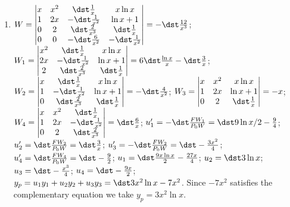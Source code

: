 \documentclass[openany]{book}
\newenvironment{sectionSolutions}{
 \begin{enumerate}[item-label={\thesection.\arabic{enumi}.}]
}{
 \end{enumerate}
}
\begin{document}
\begin{sectionSolutions}
\item
$W=\begin{vmatrix}
x&x^2&\dst\frac{1}{ x}&x\ln x\\1&2x&-\dst\frac{1}{ x^2}&\ln x+1\\
0&2&\dst\frac{2}{ x^3}&\dst\frac{1}{ x}\\0&0&-\dst\frac{6}{ x^2}&-\dst\frac{1}{ x^2}
\end{vmatrix}=-\dst\frac{12}{ x^3}$;
$W_1=\begin{vmatrix}
x^2&\dst\frac{1}{ x}&x\ln x\\2x&-\dst\frac{1}{ x^2}&\ln x+1\\
2&\dst\frac{2}{ x^3}&\dst\frac{1}{ x}\end{vmatrix}=6\dst\frac{\ln
x}{ x}-\dst\frac{3}{ x}$;
$W_2=\begin{vmatrix}
x&\dst\frac{1}{ x}&x\ln x\\1&-\dst\frac{1}{ x^2}&\ln x+1\\
0&\dst\frac{2}{ x^3}&\dst\frac{1}{ x}\end{vmatrix}=-\dst\frac{4}{
x^2}$;
$W_3=\begin{vmatrix}x&x^2&x\ln x\\
1&2x&\ln x+1\\0&2&\dst\frac{1}{ x}\end{vmatrix}=-x$;
$W_4=\begin{vmatrix}
x&x^2&\dst\frac{1}{ x}\\1&2x&-\dst\frac{1}{ x^2}\\0&2&\dst\frac{2}{ x^3}
\end{vmatrix}=\dst\frac{6}{ x}$;
$u_1'=-\dst\frac{FW_1}{ P_0W}=\dst9\ln x/2-\frac{9}{ 4}$;
$u_2'=\dst\frac{FW_2}{ P_0W}=\dst\frac{3}{ x}$;
$u_3'=-\dst\frac{FW_2}{ P_0W}=\dst-\frac{3x^2}{ 4}$;
$u_4'=\dst\frac{FW_4}{ P_0W}=\dst-\frac{9}{ 2}$;
$u_1=\dst\frac{9x\ln x}{ 2}-\frac{27x}{ 4}$;
$u_2=\dst3\ln x$;
$u_3=\dst-\frac{x^3}{ 4}$;
$u_4=\dst-\frac{9x}{ 2}$;
$y_p=u_1y_1+u_2y_2+u_3y_3=\dst3x^2\ln x-7x^2$.
Since $-7x^2$ satisfies the complementary equation we take
$y_p=3x^2\ln x$.


\end{sectionSolutions}
\end{document}
